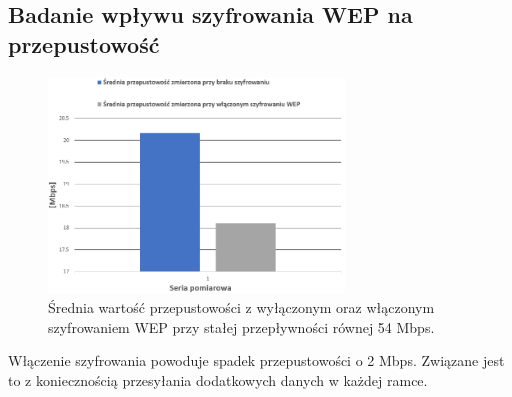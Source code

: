 \documentclass[12pt, a4paper, oneside]{article}
\begin{document}
\subsection{Badanie wpływu szyfrowania WEP na przepustowość}
\begin{figure}[h!]
\centering
\includegraphics[width=0.7\textwidth]{pics/f11.png}
\caption{Średnia wartość przepustowości z wyłączonym oraz włączonym szyfrowaniem WEP przy stałej przepływności równej 54 Mbps.}
\end{figure}
\indent Włączenie szyfrowania powoduje spadek przepustowości o 2 Mbps. Związane jest to z koniecznością przesyłania dodatkowych danych w każdej ramce.
\end{document}
